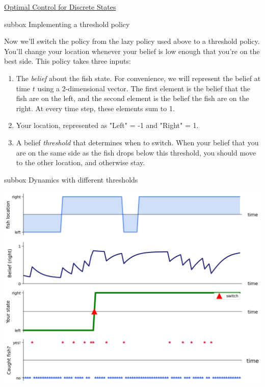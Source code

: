 \begin{textbox}{\href{https://compneuro.neuromatch.io/tutorials/W3D3_OptimalControl/student/W3D3_Tutorial1.html}{Optimal Control for Discrete States }   }


\begin{subbox}{subbox}{ Implementing a threshold policy}
\scriptsize

Now we'll switch the policy from the lazy policy used above to a threshold policy. You'll change your location whenever your belief is low enough that you're on the best side. This policy takes three inputs: 
\begin{enumerate}
    \item 
 The \textit{belief} about the fish state. For convenience, we will represent the belief at time $t$ using a 2-dimensional vector. The first element is the belief that the fish are on the left, and the second element is the belief the fish are on the right. At every time step, these elements sum to 1.

\item  Your location, represented as "Left" = -1 and "Right" = 1. 

\item  A belief \textit{threshold} that determines when to switch. When your belief that you are on the same side as the fish drops below this threshold, you should move to the other location, and otherwise stay.
\end{enumerate}
\end{subbox}

\begin{subbox}{subbox}{ Dynamics with different thresholds}
\begin{center}
    
\includegraphics[scale=0.2]{Figures/OC/OC_Figure4.png}
\end{center}

\end{subbox}
\end{textbox}
